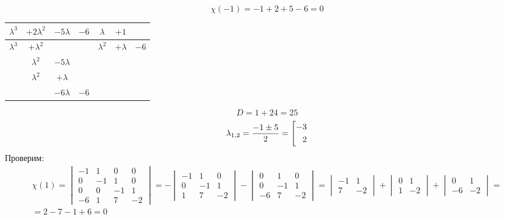 $$ \chi(-1) = -1 + 2 + 5 - 6 = 0 $$
\begin{tabular}{c c c c | c c c}
	$ \lambda^3 $ & $ + 2\lambda^2 $ & $ -5\lambda $ & $ -6 $ & $ \lambda $ & $ +1 $ \\
    \hline
    $ \lambda^3 $ & $ + \lambda^2 $ & & & $ \lambda^2 $ & $ +\lambda $ & $ -6 $ \\
    \hline
    & $ \lambda^2 $ & $ -5\lambda $ & \\
    & $ \lambda^2 $ & $ +\lambda $ & \\
    \hline
    & & $ -6\lambda $ & $ -6 $
\end{tabular}
$$ D = 1 + 24 = 25 $$
$$ \lambda_{1,2} = \half[-1 \pm 5] = \left[
\begin{aligned}
	-3 \\
    2
\end{aligned} \right. $$
Проверим:
\begin{multline*}
    \chi(1) =
    \begin{vmatrix}
        -1 & 1 & 0 & 0 \\
        0 & -1 & 1 & 0 \\
        0 & 0 & -1 & 1 \\
        -6 & 1 & 7 & -2
    \end{vmatrix} = -
    \begin{vmatrix}
        -1 & 1 & 0 \\
        0 & -1 & 1 \\
        1 & 7 & -2
    \end{vmatrix} -
    \begin{vmatrix}
        0 & 1 & 0 \\
        0 & -1 & 1 \\
        -6 & 7 & -2
    \end{vmatrix} =
    \begin{vmatrix}
        -1 & 1 \\
        7 & -2
    \end{vmatrix} +
    \begin{vmatrix}
        0 & 1 \\
        1 & -2
    \end{vmatrix} +
    \begin{vmatrix}
        0 & 1 \\
        -6 & -2
    \end{vmatrix} = \\
    = 2 - 7 - 1 + 6 = 0
\end{multline*}
